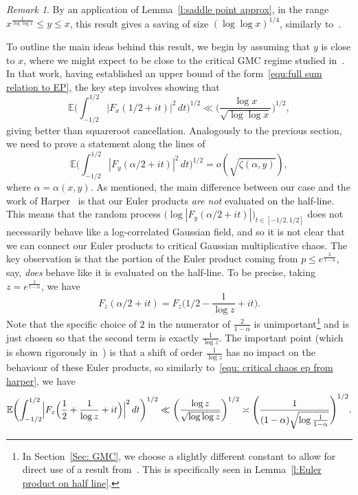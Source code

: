 \documentclass[12pt,a4paper,reqno]{amsart}
\numberwithin{equation}{section}
\def\E{\mathbb E}
\def\leq {\leqslant}
\theoremstyle{remark}
\newtheorem*{xremark}{Remark}
\theoremstyle{definition}
\numberwithin{equation}{section}
\theoremstyle{remark}
\def\E{\mathbb E}
\begin{document}
\begin{xremark}
By an application of Lemma~\ref{l:saddle point approx}, in the range $x^{\frac{1}{\log \log x}} \leq y \leq x$, this result gives a saving of size $(\log \log x)^{1/4}$, similarly to~\cite{HarperLow}.
\end{xremark}

To outline the main ideas behind this result, we begin by assuming that $y$ is close to $x$, where we might expect to be close to the critical GMC regime studied in~\cite{HarperLow}. In that work, having established an upper bound of the form~\eqref{equ:full sum relation to EP}, the key step involves showing that 
\begin{equation}\label{equ: critical chaos ep from harper}
\E \biggl( \int_{-1/2}^{1/2} |F_x (1/2 + it)|^2 \, dt \biggr)^{1/2} \ll \biggl( \frac{\log x}{\sqrt{\log \log x}} \biggr)^{1/2},
\end{equation}
giving better than squareroot cancellation. Analogously to the previous section, we need to prove a statement along the lines of
\[
\E \biggl( \int_{-1/2}^{1/2} |F_y (\alpha/2 + it)|^2 \, dt \biggr)^{1/2} = o \left( \sqrt{\zeta(\alpha,y)} \right) ,
\]
where $\alpha = \alpha(x,y)$. As mentioned, the main difference between our case and the work of Harper~\cite{HarperLow} is that our Euler products \emph{are not} evaluated on the half-line. This means that the random process $\bigl( \log |F_y (\alpha/2 + it)| \bigr)_{t \in [-1/2,1/2]}$ does not necessarily behave like a log-correlated Gaussian field, and so it is not clear that we can connect our Euler products to critical Gaussian multiplicative chaos. The key observation is that the portion of the Euler product coming from $p \leq e^{\frac{2}{1 - \alpha}}$, say, \emph{does} behave like it is evaluated on the half-line. To be precise, taking $z = e^{\frac{2}{1 - \alpha}}$, we have
\[
F_z (\alpha / 2 + it) = F_{z} \biggl( 1/2  - \frac{1}{\log z} + it \biggr).
\]
Note that the specific choice of $2$ in the numerator of $\frac{2}{1 - \alpha}$ is unimportant\footnote{In Section~\ref{Sec: GMC}, we choose a slightly different constant to allow for direct use of a result from~\cite{HarperLow}. This is specifically seen in Lemma~\ref{l:Euler product on half line}.} and is just chosen so that the second term is exactly $\frac{1}{\log z}$. The important point (which is shown rigorously in~\cite{HarperLow}) is that a shift of order $\frac{1}{\log z}$ has no impact on the behaviour of these Euler products, so similarly to~\eqref{equ: critical chaos ep from harper}, we have
\[
\E \biggl( \int_{-1/2}^{1/2} \Bigl| F_z \Bigl( \frac{1}{2} + \frac{1}{\log z} + it \Bigr) \Bigr|^2 \, dt \biggr)^{1/2} \ll \biggl( \frac{\log z}{\sqrt{\log \log z}} \biggr)^{1/2} \asymp \Biggl( \frac{1}{(1 - \alpha) \sqrt{\log \frac{1}{1 - \alpha}}} \Biggr)^{1/2} .
\]
\end{document}
